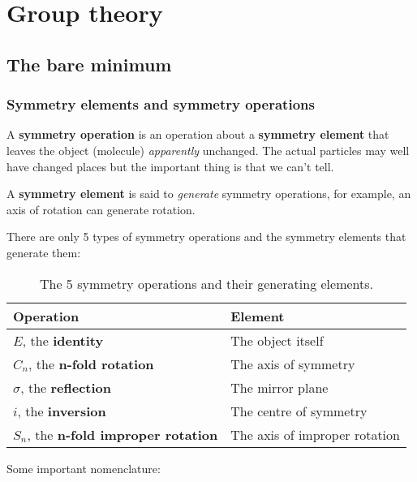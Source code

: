 \chapter{Group theory}
\section{The bare minimum}
\subsection{Symmetry elements and symmetry operations}
\begin{defi}
A \textbf{symmetry operation} is an operation about a \textbf{symmetry element} 
that leaves the object (molecule) \textit{apparently} unchanged. 
The actual particles may well have changed places but 
the important thing is that we can't tell. 
\end{defi}
\begin{defi}
A \textbf{symmetry element} is said to \textit{generate} symmetry operations, for example, an axis of rotation can generate rotation. 
\end{defi}
There are only 5 types of symmetry operations and the symmetry elements that 
generate them: 
\begin{table}[H]
\centering
\begin{tabular}{l|l}
Operation & Element\\
\hline
$E$, the \textbf{identity}& The object itself\\
$C_n$, the \textbf{$\boldsymbol{n}$-fold rotation}& The axis of symmetry\\
$\sigma$, the \textbf{reflection}& The mirror plane\\
$i$, the \textbf{inversion}& The centre of symmetry\\
$S_n$, the \textbf{$\boldsymbol{n}$-fold improper rotation}& The axis of improper rotation
\end{tabular}
\caption{The 5 symmetry operations and their generating elements.}
\end{table}
Some important nomenclature:
